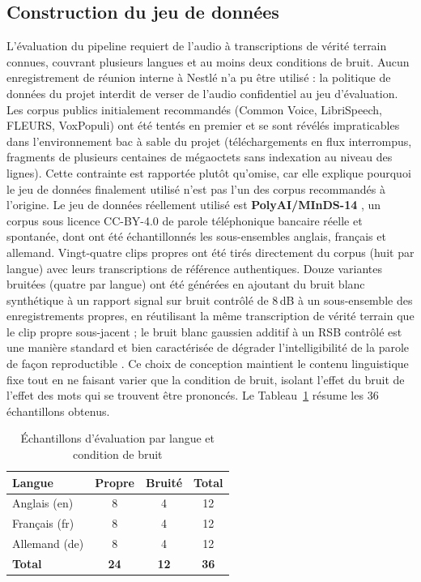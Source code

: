 \documentclass[12pt]{report}
\begin{document}
\subsection{Construction du jeu de données}
L'évaluation du pipeline requiert de l'audio à transcriptions de vérité terrain connues, couvrant plusieurs langues et au moins deux conditions de bruit. Aucun enregistrement de réunion interne à Nestl\'e n'a pu être utilisé : la politique de données du projet interdit de verser de l'audio confidentiel au jeu d'évaluation. Les corpus publics initialement recommandés (Common Voice, LibriSpeech, FLEURS, VoxPopuli) ont été tentés en premier et se sont révélés impraticables dans l'environnement bac à sable du projet (téléchargements en flux interrompus, fragments de plusieurs centaines de mégaoctets sans indexation au niveau des lignes). Cette contrainte est rapportée plutôt qu'omise, car elle explique pourquoi le jeu de données finalement utilisé n'est pas l'un des corpus recommandés à l'origine.
Le jeu de données réellement utilisé est \textbf{PolyAI/MInDS-14} \cite{gerz2021multilingual}, un corpus sous licence CC-BY-4.0 de parole téléphonique bancaire réelle et spontanée, dont ont été échantillonnés les sous-ensembles anglais, français et allemand. Vingt-quatre clips propres ont été tirés directement du corpus (huit par langue) avec leurs transcriptions de référence authentiques. Douze variantes bruitées (quatre par langue) ont été générées en ajoutant du bruit blanc synthétique à un rapport signal sur bruit contrôlé de 8\,dB à un sous-ensemble des enregistrements propres, en réutilisant la même transcription de vérité terrain que le clip propre sous-jacent ; le bruit blanc gaussien additif à un RSB contrôlé est une manière standard et bien caractérisée de dégrader l'intelligibilité de la parole de façon reproductible \cite{graetzer2021intelligibility}. Ce choix de conception maintient le contenu linguistique fixe tout en ne faisant varier que la condition de bruit, isolant l'effet du bruit de l'effet des mots qui se trouvent être prononcés. Le Tableau~\ref{tab:dataset} résume les 36 échantillons obtenus.
\begin{table}[H]
\centering
\begin{tabular}{|l|c|c|c|}
\hline
\textbf{Langue} & \textbf{Propre} & \textbf{Bruité} & \textbf{Total} \\ \hline
Anglais (en) & 8 & 4 & 12 \\ \hline
Français (fr) & 8 & 4 & 12 \\ \hline
Allemand (de) & 8 & 4 & 12 \\ \hline
\textbf{Total} & \textbf{24} & \textbf{12} & \textbf{36} \\ \hline
\end{tabular}
\caption{Échantillons d'évaluation par langue et condition de bruit}
\label{tab:dataset}
\end{table}
\end{document}
